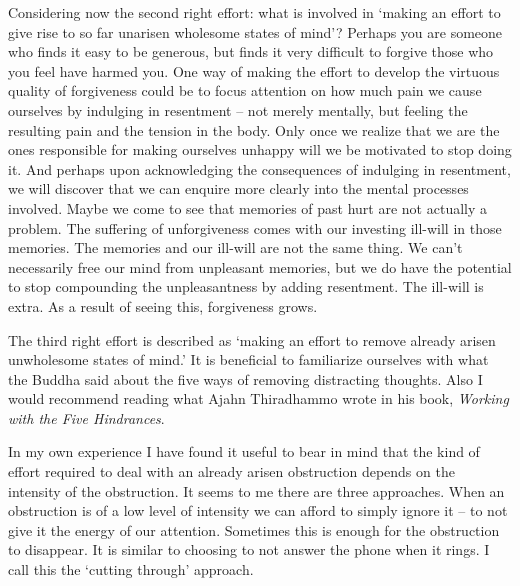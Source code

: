 Considering now the second right effort: what is involved in `making an
effort to give rise to so far unarisen wholesome states of mind'?
Perhaps you are someone who finds it easy to be generous, but finds it
very difficult to forgive those who you feel have harmed you. One way of
making the effort to develop the virtuous quality of forgiveness could
be to focus attention on how much pain we cause ourselves by indulging
in resentment -- not merely mentally, but feeling the resulting pain and
the tension in the body. Only once we realize that we are the ones
responsible for making ourselves unhappy will we be motivated to stop
doing it. And perhaps upon acknowledging the consequences of indulging
in resentment, we will discover that we can enquire more clearly into
the mental processes involved. Maybe we come to see that memories of
past hurt are not actually a problem. The suffering of unforgiveness
comes with our investing ill-will in those memories. The memories and
our ill-will are not the same thing. We can't necessarily free our mind
from unpleasant memories, but we do have the potential to stop
compounding the unpleasantness by adding resentment. The ill-will is
extra. As a result of seeing this, forgiveness grows.

The third right effort is described as `making an effort to remove
already arisen unwholesome states of mind.' It is beneficial to
familiarize ourselves with what the Buddha said about the five ways of
removing distracting thoughts\cite{thoughts}. Also I would recommend reading what
Ajahn Thiradhammo wrote in his book, \emph{Working with the Five Hindrances}\cite{hindrances}.

In my own experience I have found it useful to bear in mind that the
kind of effort required to deal with an already arisen obstruction
depends on the intensity of the obstruction. It seems to me there are
three approaches. When an obstruction is of a low level of intensity we
can afford to simply ignore it -- to not give it the energy of our
attention. \mbox{Sometimes} this is enough for the obstruction to disappear. It
is similar to choosing to not answer the phone when it rings. I call
this the `cutting through' approach.

